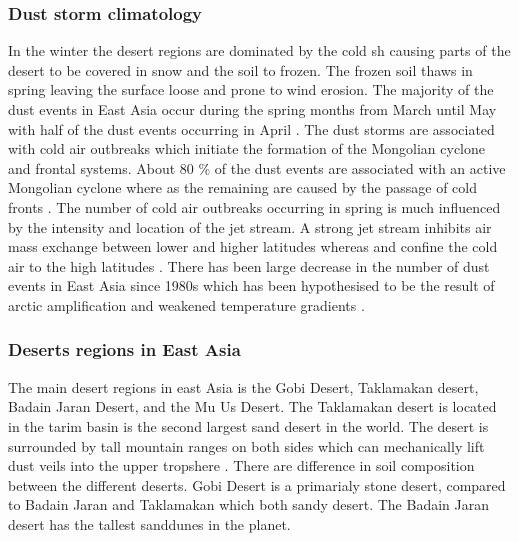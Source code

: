 \subsubsection{Dust storm climatology}
In the winter the desert regions are dominated by the cold \acrshort{sh} causing parts of the desert to be covered in snow and the soil to frozen. The frozen soil thaws in spring leaving the surface loose and prone to wind erosion. 
The majority of the dust events in East Asia occur during the spring months from March until May with half of the dust events occurring in April \parencite{sun2001spatial}. The dust storms are associated with cold air outbreaks which initiate the formation of the Mongolian cyclone and frontal systems. About 80 \% of the dust events are associated with an active Mongolian cyclone where as the remaining are caused by the passage of cold fronts \parencite{sun2001spatial}.
The number of cold air outbreaks occurring in spring is much influenced by the intensity and location of the jet stream. A strong jet stream inhibits air mass exchange between lower and higher latitudes whereas and confine the cold air to the high latitudes \parencite{wang2008variability}. There has been large decrease in the number of dust events in East Asia since 1980s which has been hypothesised to be the result of arctic amplification and weakened temperature gradients \parencite{liu2020impact}. 


\subsubsection{Deserts regions in East Asia}
The main desert regions in east Asia is the Gobi Desert, Taklamakan desert, Badain Jaran Desert,  and the Mu Us Desert. The Taklamakan desert is located in the tarim basin is the second largest sand desert in the world. The desert is surrounded by tall mountain ranges on both sides which can mechanically lift dust veils into the upper tropshere \parencite{yumimoto_elevated_2009}.   There are difference in soil composition between the different deserts. Gobi Desert is a primarialy stone desert, compared to Badain Jaran and Taklamakan which both sandy desert. The Badain Jaran desert has the tallest sanddunes in the planet. 

